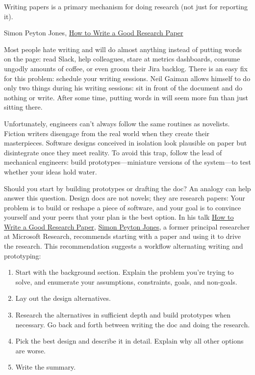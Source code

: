 \documentclass{article}
\begin{document}
\epigraph{
Writing papers is a primary mechanism for doing research (not just for reporting it).
}{Simon Peyton Jones, \href{https://youtu.be/WP-FkUaOcOM}{How to Write a Good Research Paper}}

Most people hate writing and will do almost anything instead of putting words on the page: read Slack, help colleagues, stare at metrics dashboards, consume ungodly amounts of coffee, or even groom their Jira backlog.
There is an easy fix for this problem: schedule your writing sessions.
Neil Gaiman allows himself to do only two things during his writing sessions: sit in front of the document and do nothing or write.
After some time, putting words in will seem more fun than just sitting there.

Unfortunately, engineers can't always follow the same routines as novelists.
Fiction writers disengage from the real world when they create their masterpieces.
Software designs conceived in isolation look plausible on paper but disintegrate once they meet reality.
To avoid this trap, follow the lead of mechanical engineers: build prototypes---miniature versions of the system---to test whether your ideas hold water.

Should you start by building prototypes or drafting the doc? An analogy can help answer this question.
Design docs are not novels; they are research papers:
Your problem is to build or reshape a piece of software, and your goal is to convince yourself and your peers that your plan is the best option.
In his talk \href{https://youtu.be/WP-FkUaOcOM}{How to Write a Good Research Paper}, \href{https://simon.peytonjones.org/}{Simon Peyton Jones}, a former principal researcher at Microsoft Research, recommends starting with a paper and using it to drive the research.
This recommendation suggests a workflow alternating writing and prototyping:
\begin{enumerate}
\item Start with the background section.
  Explain the problem you're trying to solve, and enumerate your assumptions, constraints, goals, and non-goals.
\item Lay out the design alternatives.
\item Research the alternatives in sufficient depth and build prototypes when necessary.
  Go back and forth between writing the doc and doing the research.
\item Pick the best design and describe it in detail.
  Explain why all other options are worse.
\item Write the summary.
\end{enumerate}
\end{document}
